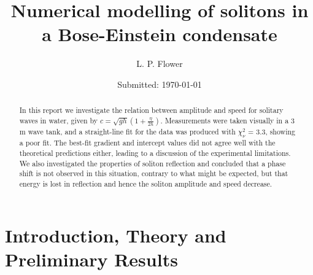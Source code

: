 \documentclass[10pt, twocolumn]{revtex4}    %
\begin{document}
                     


\title{Numerical modelling of solitons in a Bose-Einstein condensate} 
\date{Submitted: \today{}}
\author{L. P. Flower}

\begin{abstract}              
 
In this report we investigate the relation between amplitude and speed for solitary waves in water, given by $c = \sqrt{gh} \left(1 + \frac{\eta}{2h} \right)$. Measurements were taken visually in a 3 m wave tank, and a straight-line fit for the data was produced with $\chi_\nu^2$ = 3.3, showing a poor fit. The best-fit gradient and intercept values did not agree well with the theoretical predictions either, leading to a discussion of the experimental limitations. We also investigated the properties of soliton reflection and concluded that a phase shift is not observed in this situation, contrary to what might be expected, but that energy is lost in reflection and hence the soliton amplitude and speed decrease. 

\end{abstract}

\maketitle
\thispagestyle{plain} %



\section{Introduction, Theory and Preliminary Results} \label{Intro}
\end{document}
